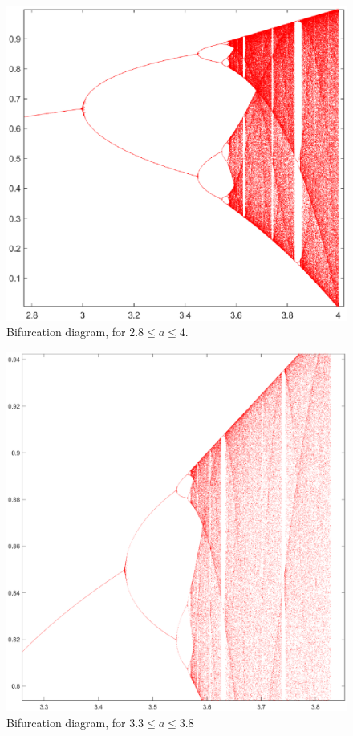 \documentclass[twocolumn,amsmath,amssymb,aps]{revtex4}
\begin{document}
\begin{figure}[!htb]
	\centering
	\includegraphics[scale=0.4]{logistic_1}
	\caption{Bifurcation diagram, for $2.8 \leq a \leq 4$.}
	\label{fig:logistic_1}
\end{figure}
\begin{figure}[!htb]
	\centering
	\includegraphics[scale=0.3]{logistic_3}
	\caption{Bifurcation diagram, for $3.3 \leq a \leq 3.8$}
	\label{fig:logistic_3}
\end{figure}
\end{document}
